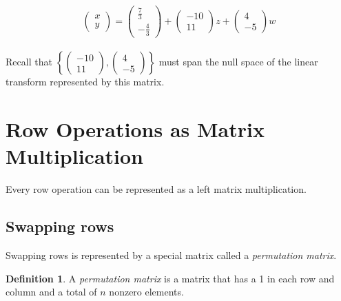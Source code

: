 \documentclass{article}
\theoremstyle{definition}
\newtheorem{definition}{Definition}
\begin{document}
\begin{equation*}
	\left(
		\begin{matrix}
			x \\
			y
		\end{matrix}
	\right) = \left(
		\begin{matrix}
			\frac{7}{3} \\
			-\frac{4}{3}
		\end{matrix}
	\right) + \left(
		\begin{matrix}
			-10 \\
			11
		\end{matrix}
	\right)z + \left(
		\begin{matrix}
			4 \\
			-5
		\end{matrix}
	\right)w
\end{equation*}
\\
Recall that \begin{math}
	\left\{\left(
		\begin{matrix}
			-10 \\
			11
		\end{matrix}
	\right),
	\left(
		\begin{matrix}
			4 \\
			-5
		\end{matrix}
	\right)\right\}
\end{math} must span the null space of the linear transform represented by this matrix.

\section{Row Operations as Matrix Multiplication}
Every row operation can be represented as a left matrix multiplication.

\subsection{Swapping rows}
Swapping rows is represented by a special matrix called a \emph{permutation matrix}.

\begin{definition}
	A \emph{permutation matrix} is a matrix that has a 1 in each row and column and a total of $n$ nonzero elements.
\end{definition}
\end{document}
